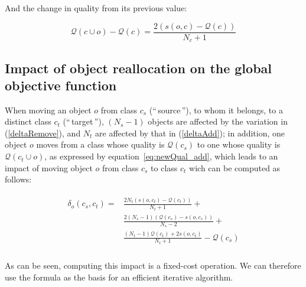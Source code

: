 \documentclass[natbib,smallextended]{svjour3}
\newcommand{\gl}[1]{``\,#1\,''} %
\begin{document}
\noindent And the change in quality from its previous value:

\begin{equation} \label{deltaAdd}
    \mathcal{Q}\left(c \cup o\right) - \mathcal{Q}\left(c\right)  = \frac{2\left(s\left(o, c\right)-\mathcal{Q}(c)\right)}{N_c+1}
\end{equation}


\subsection{Impact of object reallocation on the global objective function}

When moving an object $o$ from class $c_s$ (\gl{source}), to whom it belongs, to a
distinct class $c_t$ (\gl{target}), $(N_s-1)$ objects are affected
by the variation in (\ref{deltaRemove}), and $N_t$ are affected
by that in (\ref{deltaAdd}); in addition, one object $o$ moves from a class whose quality is $\mathcal{Q}(c_s)$ to one whose quality is $\mathcal{Q}\left(c_t \cup o\right)$, as expressed by equation~\ref{eq:newQual_add}, which leads to an impact of moving object $o$ from class $c_s$ to class $c_t$ wich can be computed as follows:

\begin{align}
\begin{split}
  \delta_o(c_s, c_t) = & \frac{2N_t \left(s\left(o, c_t\right)-\mathcal{Q}(c_t)\right)}{N_t+1} + \\
&  \frac{2(N_s-1)\left( \mathcal{Q}(c_s) - s\left(o, c_s\right)\right)}{N_s-2}  + \\
 &  \frac{(N_t-1) \mathcal{Q}(c_t)  + 2s\left(o, c_t\right)}{N_t+1} - \mathcal{Q}(c_s) \\
\end{split}
  \label{eq:impact_classnorm}
\end{align}

As can be seen, computing this impact is a fixed-cost operation. We can therefore use the formula as the basis for an efficient iterative algorithm.
\end{document}
